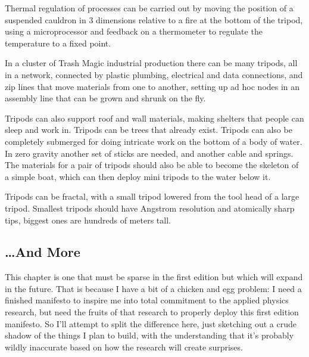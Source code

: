 Thermal regulation of processes can be carried out by moving the
position of a suspended cauldron in 3 dimensions relative to a fire at
the bottom of the tripod, using a microprocessor and feedback on a
thermometer to regulate the temperature to a fixed point.

In a cluster of Trash Magic industrial production there can be many
tripods, all in a network, connected by plastic plumbing, electrical and
data connections, and zip lines that move materials from one to another,
setting up ad hoc nodes in an assembly line that can be grown and shrunk
on the fly.

Tripods can also support roof and wall materials, making shelters that
people can sleep and work in. Tripods can be trees that already exist.
Tripods can also be completely submerged for doing intricate work on the
bottom of a body of water. In zero gravity another set of sticks are
needed, and another cable and springs. The materials for a pair of
tripods should also be able to become the skeleton of a simple boat,
which can then deploy mini tripods to the water below it.

Tripods can be fractal, with a small tripod lowered from the tool head
of a large tripod. Smallest tripods should have Angstrom resolution and
atomically sharp tips, biggest ones are hundreds of meters tall.

\subsection{\ldots{}And More}\label{and-more}

This chapter is one that must be sparse in the first edition but which
will expand in the future. That is because I have a bit of a chicken and
egg problem: I need a finished manifesto to inspire me into total
commitment to the applied physics research, but need the fruits of that
research to properly deploy this first edition manifesto. So I'll
attempt to split the difference here, just sketching out a crude shadow
of the things I plan to build, with the understanding that it's probably
wildly inaccurate based on how the research will create surprises.
